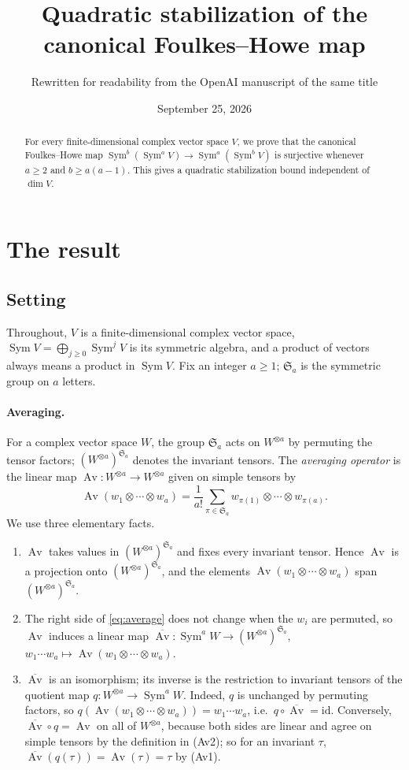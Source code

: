 \documentclass[11pt]{article}
\title{Quadratic stabilization of the canonical Foulkes--Howe map}
\author{Rewritten for readability from the OpenAI manuscript of the same title}
\date{September 25, 2026}
\theoremstyle{remark}
\DeclareMathOperator{\Sym}{Sym}
\DeclareMathOperator{\Av}{Av}
\newcommand{\Sa}{\mathfrak S_a}
\begin{document}
\maketitle
\begin{abstract}
For every finite-dimensional complex vector space $V$, we prove that the
canonical Foulkes--Howe map
$\Sym^b(\Sym^a V)\longrightarrow\Sym^a(\Sym^b V)$ is surjective whenever
$a\ge2$ and $b\ge a(a-1)$. This gives a quadratic stabilization bound
independent of $\dim V$.
\end{abstract}

\section{The result}\label{sec:result}

\subsection{Setting}

Throughout, $V$ is a finite-dimensional complex vector space,
$\Sym V=\bigoplus_{j\ge0}\Sym^jV$ is its symmetric algebra, and a product
of vectors always means a product in $\Sym V$. Fix an integer $a\ge1$;
$\Sa$ is the symmetric group on $a$ letters.

\paragraph{Averaging.}
For a complex vector space $W$, the group $\Sa$ acts on $W^{\otimes a}$ by
permuting the tensor factors; $(W^{\otimes a})^{\Sa}$ denotes the invariant
tensors. The \emph{averaging operator} is the linear map
$\Av\colon W^{\otimes a}\to W^{\otimes a}$ given on simple tensors by
\begin{equation}\label{eq:average}
 \Av(w_1\otimes\cdots\otimes w_a)
 =\frac1{a!}\sum_{\pi\in\Sa}
 w_{\pi(1)}\otimes\cdots\otimes w_{\pi(a)}.
\end{equation}
We use three elementary facts.
\begin{enumerate}[label=(Av\arabic*),leftmargin=3.2em]
\item $\Av$ takes values in $(W^{\otimes a})^{\Sa}$ and fixes every
invariant tensor. Hence $\Av$ is a projection onto $(W^{\otimes a})^{\Sa}$,
and the elements $\Av(w_1\otimes\cdots\otimes w_a)$ span
$(W^{\otimes a})^{\Sa}$.
\item The right side of \eqref{eq:average} does not change when the $w_i$
are permuted, so $\Av$ induces a linear map
$\overline{\Av}\colon\Sym^aW\to(W^{\otimes a})^{\Sa}$,
$w_1\cdots w_a\mapsto\Av(w_1\otimes\cdots\otimes w_a)$.
\item $\overline{\Av}$ is an isomorphism; its inverse is the restriction to
invariant tensors of the quotient map $q\colon W^{\otimes a}\to\Sym^aW$.
Indeed, $q$ is unchanged by permuting factors, so
$q(\Av(w_1\otimes\cdots\otimes w_a))=w_1\cdots w_a$, i.e.\
$q\circ\overline{\Av}=\mathrm{id}$. Conversely,
$\overline{\Av}\circ q=\Av$ on all of $W^{\otimes a}$, because both sides
are linear and agree on simple tensors by the definition in (Av2); so for
an invariant $\tau$, $\overline{\Av}(q(\tau))=\Av(\tau)=\tau$ by (Av1).
\end{enumerate}
\end{document}
